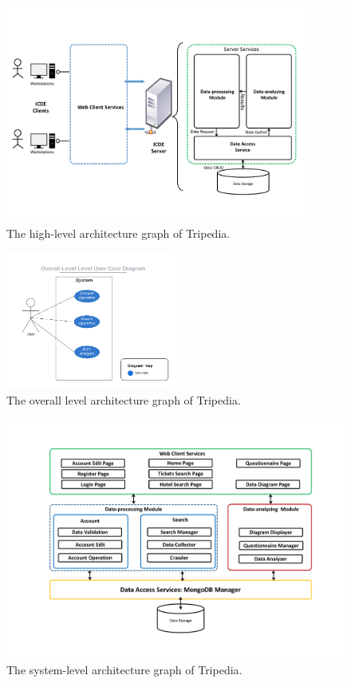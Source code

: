 \documentclass[conference]{IEEEtran}
\begin{document}
\begin{figure}[htbp]
\centerline{\includegraphics[width=0.9\textwidth]{Architecture.pdf}}
\caption{The high-level architecture graph of Tripedia.}
\label{high_level_arch}
\end{figure}

\begin{figure}[htbp]
\centerline{\includegraphics[width=0.5\textwidth]{user_diagram_overall.pdf}}
\caption{The overall level architecture graph of Tripedia.}
\label{overall_level_user_case}
\end{figure}


\begin{figure}[htbp]
\centerline{\includegraphics[width=1.0\textwidth]{Architecture2.pdf}}
\caption{The system-level architecture graph of Tripedia.}
\label{system_level_arch}
\end{figure}
\end{document}
